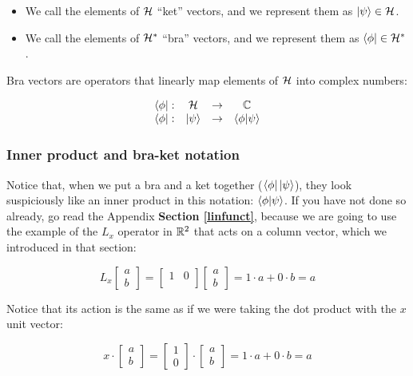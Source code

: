 \begin{itemize}
    \item We call the elements of $\mathcal{H}$ ``ket'' vectors, and we represent them as $\ket{\psi}\in\mathcal{H}$.
    \item We call the elements of $\mathcal{H}^*$ ``bra'' vectors, and we represent them as $\bra{\phi}\in\mathcal{H}^*$.
\end{itemize}

Bra vectors are operators that linearly map elements of $\mathcal{H}$ into complex numbers:

\begin{equation}
    \begin{matrix}
    \bra{\phi}: & \mathcal{H} & \rightarrow & \mathbb{C}\\
    \bra{\phi}: & \ket{\psi} & \rightarrow & \braket{\phi|\psi}\\
    \end{matrix}
\end{equation}

\subsubsection{Inner product and bra-ket notation}

Notice that, when we put a bra and a ket together ($\bra{\phi}\ket{\psi}$), they look suspiciously like an inner product in this notation: $\braket{\phi|\psi}$. If you have not done so already, go read the Appendix \textbf{Section \ref{linfunct}}, because we are going to use the example of the $L_x$ operator in $\mathbb{R}^2$ that acts on a column vector, which we introduced in that section:

\begin{equation}
    L_x\begin{bmatrix}
        a \\ b
    \end{bmatrix} =
    \begin{bmatrix}
        1 & 0 \\
    \end{bmatrix}
    \begin{bmatrix}
        a \\ b
    \end{bmatrix} = 1 \cdot a + 0\cdot b = a
\end{equation}

Notice that its action is the same as if we were taking the dot product with the $x$ unit vector:

\begin{equation}
    x\cdot\begin{bmatrix}
        a \\ b
    \end{bmatrix} = 
    \begin{bmatrix}
        1 \\ 0
    \end{bmatrix}\cdot
    \begin{bmatrix}
        a \\ b
    \end{bmatrix} = 1 \cdot a + 0\cdot b = a
\end{equation}

